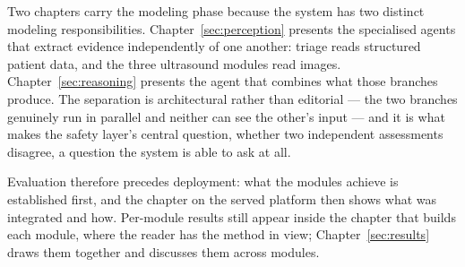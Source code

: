 Two chapters carry the modeling phase because the system has two distinct modeling
responsibilities. Chapter~\ref{sec:perception} presents the specialised agents that extract
evidence independently of one another: triage reads structured patient data, and the three
ultrasound modules read images. Chapter~\ref{sec:reasoning} presents the agent that combines
what those branches produce. The separation is architectural rather than editorial --- the two
branches genuinely run in parallel and neither can see the other's input --- and it is what
makes the safety layer's central question, whether two independent assessments disagree,
a question the system is able to ask at all.

Evaluation therefore precedes deployment: what the modules achieve is established first, and
the chapter on the served platform then shows what was integrated and how. Per-module results
still appear inside the chapter that builds each module, where the reader has the method in
view; Chapter~\ref{sec:results} draws them together and discusses them across modules.

